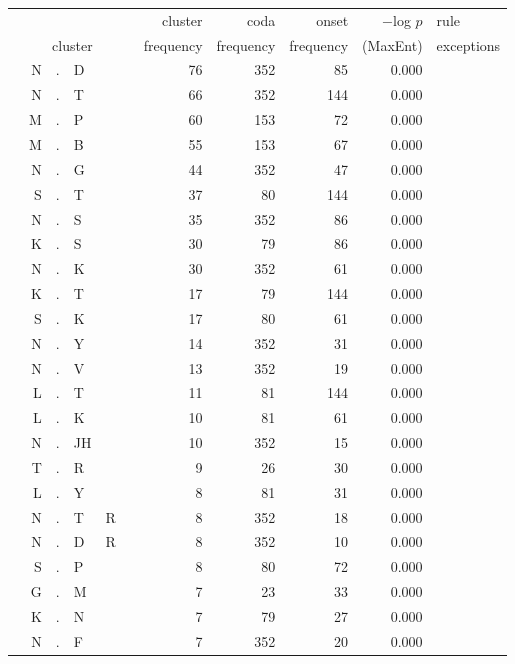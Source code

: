 \begin{longtable}{r@{ } r@{ } c@{ } l@{ } l@{ } l@{ } r r r r l }
\toprule
 &  &  &  &  &  &  cluster  &  coda  &  onset  &  $-$log $p$  &  rule \\
\multicolumn{6}{c}{cluster}  &  frequency  &  frequency  &  frequency  &  (MaxEnt)  &  exceptions\\ 
\midrule
  & N & . & D &   &   & 76 & 352 & 85 & 0.000 &  \\
  & N & . & T &   &   & 66 & 352 & 144 & 0.000 &  \\
  & M & . & P &   &   & 60 & 153 & 72 & 0.000 &  \\
  & M & . & B &   &   & 55 & 153 & 67 & 0.000 &  \\
  & N & . & G &   &   & 44 & 352 & 47 & 0.000 &  \\
  & S & . & T &   &   & 37 & 80 & 144 & 0.000 &  \\
  & N & . & S &   &   & 35 & 352 & 86 & 0.000 &  \\
  & K & . & S &   &   & 30 & 79 & 86 & 0.000 &  \\
  & N & . & K &   &   & 30 & 352 & 61 & 0.000 &  \\
  & K & . & T &   &   & 17 & 79 & 144 & 0.000 &  \\
  & S & . & K &   &   & 17 & 80 & 61 & 0.000 &  \\
  & N & . & Y &   &   & 14 & 352 & 31 & 0.000 &  \\
  & N & . & V &   &   & 13 & 352 & 19 & 0.000 &  \\
  & L & . & T &   &   & 11 & 81 & 144 & 0.000 &  \\
  & L & . & K &   &   & 10 & 81 & 61 & 0.000 &  \\
  & N & . & JH &   &   & 10 & 352 & 15 & 0.000 &  \\
  & T & . & R &   &   & 9 & 26 & 30 & 0.000 &  \\
  & L & . & Y &   &   & 8 & 81 & 31 & 0.000 &  \\
  & N & . & T & R &   & 8 & 352 & 18 & 0.000 &  \\
  & N & . & D & R &   & 8 & 352 & 10 & 0.000 &  \\
  & S & . & P &   &   & 8 & 80 & 72 & 0.000 &  \\
  & G & . & M &   &   & 7 & 23 & 33 & 0.000 &  \\
  & K & . & N &   &   & 7 & 79 & 27 & 0.000 &  \\
  & N & . & F &   &   & 7 & 352 & 20 & 0.000 &  \\

\end{longtable}
